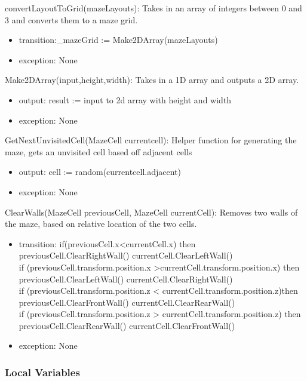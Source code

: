 \documentclass[12pt, titlepage]{article}
\begin{document}
\noindent convertLayoutToGrid(mazeLayouts): Takes in an array of integers between 0 and 3 and converts them to a maze grid.
\begin{itemize}
    \item transition:\_mazeGrid := Make2DArray(mazeLayouts)
    \item exception: None
\end{itemize}

\noindent Make2DArray(input,height,width): Takes in a 1D array and outputs a 2D array.
\begin{itemize}
    \item output: result := input to 2d array with height and width
    \item exception: None
\end{itemize}

\noindent GetNextUnvisitedCell(MazeCell currentcell): Helper function for generating the maze, gets an unvisited cell based off adjacent cells
\begin{itemize}
    \item output: cell := random(currentcell.adjacent)
    \item exception: None
\end{itemize}

\noindent ClearWalls(MazeCell previousCell, MazeCell currentCell): Removes two walls of the maze, based on relative location of the two cells.
\begin{itemize}
    \item transition: if(previousCell.x<currentCell.x) then previousCell.ClearRightWall() currentCell.ClearLeftWall()\\
    if (previousCell.transform.position.x >currentCell.transform.position.x) then previousCell.ClearLeftWall() currentCell.ClearRightWall()\\
    if (previousCell.transform.position.z < currentCell.transform.position.z)then  previousCell.ClearFrontWall() currentCell.ClearRearWall()\\
    if (previousCell.transform.position.z > currentCell.transform.position.z) then previousCell.ClearRearWall() currentCell.ClearFrontWall()
    \item exception: None
\end{itemize}


\subsubsection{Local Variables}
\end{document}

